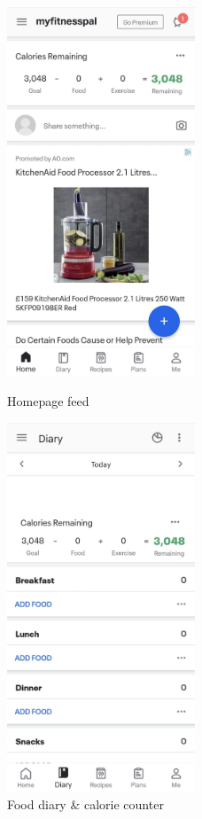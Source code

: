 \begin{figure}[H]
    \centering
    \begin{minipage}{0.5\textwidth}
        \centering
        \includegraphics[width=0.5\textwidth]{myfitnesspal/homepage.jpeg}
        \caption{Homepage feed}
        \label{fig:mfp-home}
    \end{minipage}%
    \begin{minipage}{0.5\textwidth}
        \centering
        \includegraphics[width=0.5\textwidth]{myfitnesspal/calorie-counter.jpeg}
        \caption{Food diary \& calorie counter}
        \label{fig:mfp-diary}
    \end{minipage}%
\end{figure}